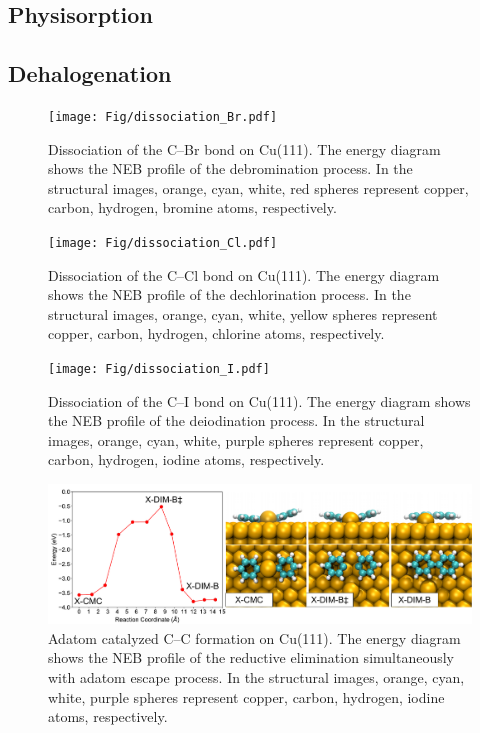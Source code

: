 \documentclass[aps,prl,reprint,amsmath,amssymb,floatfix,notitlepage]{revtex4-1}
\newcommand{\sinfo}{Supporting Information}
\newcommand{\zhzh}{\color{blue}}
\newcommand{\zhzh}{\color{blue}}
\begin{document}
\ifdefined\INTERNAL
\subsection{Physisorption}
\fi

\ifdefined\INTERNAL
\subsection{Dehalogenation}
\fi

\begin{figure}[bt]
\centering
\texttt{[image: Fig/dissociation\_Br.pdf]}
\caption{Dissociation of the C--Br bond on Cu(111). The energy diagram shows the NEB profile of the debromination process. In the structural images, orange, cyan, white, red spheres represent copper, carbon, hydrogen, bromine atoms, respectively.} %
\label{fig:dissociation_Br}
\end{figure}

\begin{figure}[hbt]
\centering
\texttt{[image: Fig/dissociation\_Cl.pdf]}
\caption{Dissociation of the C--Cl bond on Cu(111). The energy diagram shows the NEB profile of the dechlorination process. In the structural images, orange, cyan, white, yellow spheres represent copper, carbon, hydrogen, chlorine atoms, respectively.}
\label{fig:dissociation_Cl}
\end{figure}

\begin{figure}[hbt]
\centering
\texttt{[image: Fig/dissociation\_I.pdf]}
\caption{Dissociation of the C--I bond on Cu(111). The energy diagram shows the NEB profile of the deiodination process. In the structural images, orange, cyan, white, purple spheres represent copper, carbon, hydrogen, iodine atoms, respectively.}
\label{fig:dissociation_I}
\end{figure}

\begin{figure}[hbt]
\centering
\includegraphics[width=1.0\textwidth]{Fig/AlterPath.pdf}
\caption{{\zhzh Adatom catalyzed C--C formation on Cu(111). The energy diagram shows the NEB profile of the reductive elimination simultaneously with adatom escape process. In the structural images, orange, cyan, white, purple spheres represent copper, carbon, hydrogen, iodine atoms, respectively.}}
\label{fig:AlterPath}
\end{figure}
\end{document}
